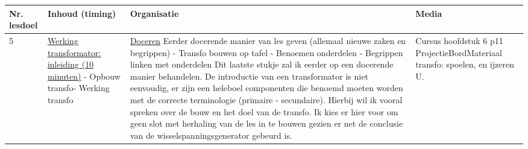\begin{landscape}
\begin{tabularx}{1.56\textwidth}{|p{1.5cm}|p{8cm}|X|p{4cm}|}
	\hline
	\textbf{Nr. lesdoel } & \textbf{Inhoud (timing)}  & \textbf{Organisatie } & \textbf{Media } \\ \hline
	5& \underline{Werking transformator:} \underline{inleiding (10 minuten)}\newline
	- Opbouw transfo\newline - Werking transfo
	&  \underline{Doceren}\newline 
	Eerder docerende manier van les geven (allemaal nieuwe zaken en begrippen) \newline
	- Transfo bouwen op tafel\newline
	- Benoemen onderdelen\newline
	- Begrippen linken met onderdelen
	Dit laatste stukje zal ik eerder op een docerende manier behandelen. De introductie van een transformator is niet eenvoudig, er zijn een heleboel componenten die benoemd moeten worden met de correcte terminologie (primaire - secundaire). Hierbij wil ik vooral spreken over de bouw en het doel van de transfo. Ik kies er hier voor om geen slot met herhaling van de les in te bouwen gezien er net de conclusie van de wisselspanningsgenerator gebeurd is. 	
	&  Cursus hoofdstuk 6 p11 \newline\newline Projectie\newline\newline Bord\newline\newline Materiaal transfo: spoelen, en ijzeren U.
	\\ \hline
\end{tabularx}\vspace{5mm}




	
\end{landscape}



